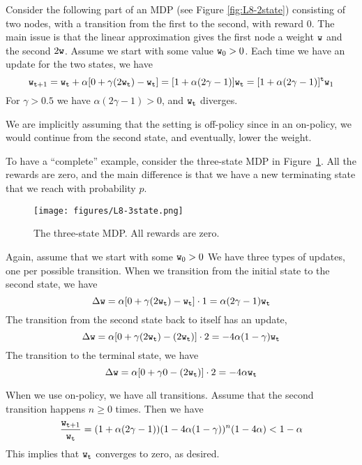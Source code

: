 Consider the following part of an MDP (see Figure
\ref{fig:L8-2state}) consisting of two nodes, with a transition from
the first to the second, with reward $0$. The main issue is that the
linear approximation gives the first node a weight ${\tt w}$ and the
second $2{\tt w}$. Assume we start with some value ${\tt w}_0>0$.
Each time we have an update for the two states, we have
\[
{\tt w}_{{\tt t}+1}={\tt w}_{\tt t} +\alpha[0+\gamma
(2{\tt w}_{\tt t})-{\tt w}_{\tt t}]=[1+\alpha(2\gamma-1)]{\tt w}_{\tt t}=[1+\alpha(2\gamma-1)]^{\tt t}{\tt w}_1
\]
For $\gamma>0.5$ we have $\alpha(2\gamma-1)>0$, and ${\tt w}_{\tt t}$
diverges.

We are implicitly assuming that the setting is off-policy since in
an on-policy, we would continue from the second state, and
eventually, lower the weight.

To have a ``complete'' example, consider the three-state MDP in
Figure~\ref{fig:L8-3state}. All the rewards are zero, and the main
difference is that we have a new terminating state that we reach
with probability $p$.

\begin{figure}
  \begin{centering}
  \texttt{[image: figures/L8-3state.png]}\\
  \caption{The three-state MDP. All rewards are zero.}\label{fig:L8-3state}
  \end{centering}
\end{figure}




Again, assume that we start with some ${\tt w}_0>0$ We have three
types of updates, one per possible transition. When we transition
from the initial state to the second state, we have
\[
\Delta {\tt w}= \alpha[0+\gamma
(2{\tt w}_{\tt t})-{\tt w}_{\tt t}]\cdot
1=\alpha(2\gamma-1){\tt w}_{\tt t}
\]
The transition from the second state back to itself has an update,
\[
\Delta {\tt w}= \alpha[0+\gamma
(2{\tt w}_{\tt t})-(2{\tt w}_{\tt t})]\cdot 2
=-4\alpha(1-\gamma){\tt w}_{\tt t}
\]
The transition to the terminal state, we have
\[
\Delta {\tt w}= \alpha[0+\gamma 0 -(2{\tt w}_{\tt t})]\cdot
2=-4\alpha {\tt w}_{\tt t}
\]

When we use on-policy, we have all transitions. Assume that the
second transition happens $n\geq 0$ times. Then we have
\[
\frac{{\tt w}_{{\tt t}+1}}{{\tt w}_{\tt t}}=(1+\alpha(2\gamma-1))(1-4\alpha(1-\gamma))^n(1-4\alpha)<
1-\alpha
\]
This implies that ${\tt w}_{\tt t}$ converges to zero, as desired.

